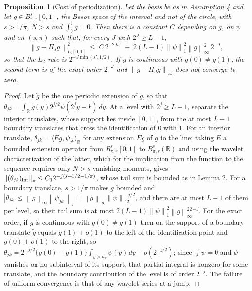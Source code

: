 \documentclass[10pt]{book}
\newtheorem{proposition}{Proposition}[section]
\theoremstyle{definition}
\newcommand{\R}{\mathbb{R}}
\newcommand{\norm}[1]{\left\lVert #1 \right\rVert}
\newcommand{\inner}[2]{\langle #1, #2 \rangle}
\newcommand{\lev}{j}
\newcommand{\tsl}{k}
\newcommand{\PiJ}{\Pi_{J}}
\newcommand{\Besov}[3]{B^{#1}_{#2,#3}}
\newcommand{\seff}{s'}
\begin{document}
\begin{proposition}[Cost of periodization]
\label{prop:periodization}
Let the basis be as in Assumption 4 and let
$g \in \Besov{s}{\pi}{r}[0,1]$, the Besov space of the interval and not of the
circle, with $s > 1/\pi$, $N > s$ and $\int_0^1 g = 0$. Then there is a
constant $C$ depending on $g$, on $\psi$ and on $(s,\pi)$ such that, for every
$J$ with $2^J \ge L-1$,
\[
  \norm{g-\PiJ g}^2_{L_2[0,1]} \;\le\; C\,2^{-2J\seff}
  \;+\; 2(L-1)\norm{\psi}_1^2\norm{g}^2_{\infty}\,2^{-J},
\]
so that the $L_2$ rate is $2^{-J\min(\seff,1/2)}$. If $g$ is continuous with
$g(0) \ne g(1)$, the second term is of the exact order $2^{-J}$ and
$\norm{g-\PiJ g}_{\infty}$ does not converge to zero.
\end{proposition}

\begin{proof}
Let $\tilde g$ be the one periodic extension of $g$, so that
$\theta_{\lev\tsl} = \int_{\R}\tilde g(y)2^{\lev/2}\psi(2^{\lev}y-\tsl)\,dy$.
At a level with $2^{\lev} \ge L-1$, separate the interior translates, whose
support lies inside $[0,1]$, from the at most $L-1$ boundary translates that
cross the identification of $0$ with $1$. For an interior translate,
$\theta_{\lev\tsl} = \inner{Eg}{\psi_{\lev\tsl}}_{\R}$ for any extension $Eg$
of $g$ to the line; taking $E$ a bounded extension operator from
$\Besov{s}{\pi}{r}[0,1]$ to $\Besov{s}{\pi}{r}(\R)$
\citep[Chapter 3]{Triebel-1983} and using the wavelet characterization of the
latter, which for the implication from the function to the sequence requires
only $N > s$ vanishing moments, gives
$\norm{(\theta_{\lev\tsl})_{\rm int}}_{\pi} \le C_12^{-\lev(s+1/2-1/\pi)}$,
whose tail sum is bounded as in Lemma 2. For a boundary translate,
$s > 1/\pi$ makes $g$ bounded and
$|\theta_{\lev\tsl}| \le \norm{g}_{\infty}\norm{\psi_{\lev\tsl}}_1 =
\norm{g}_{\infty}\norm{\psi}_12^{-\lev/2}$, and there are at most $L-1$ of
them per level, so their tail sum is at most
$2(L-1)\norm{\psi}_1^2\norm{g}_{\infty}^22^{-J}$. For the exact order, if $g$
is continuous with $g(0) \ne g(1)$ then on the support of a boundary translate
$\tilde g$ equals $g(1)+o(1)$ to the left of the identification point and
$g(0)+o(1)$ to the right, so
$\theta_{\lev\tsl} = 2^{-\lev/2}\{g(0)-g(1)\}\int_{y>a_{\tsl}}\psi(y)\,dy +
o(2^{-\lev/2})$; since $\int\psi = 0$ and $\psi$ vanishes on no subinterval of
its support, that partial integral is nonzero for some translate, and the
boundary contribution of the level is of order $2^{-\lev}$. The failure of
uniform convergence is that of any wavelet series at a jump.
\end{proof}
\end{document}

